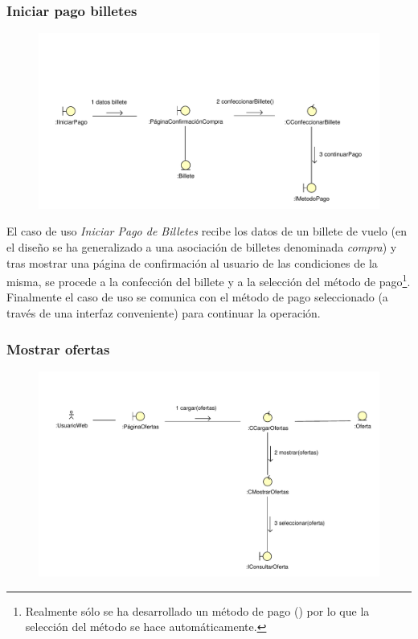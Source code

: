 \documentclass[11pt, a4paper, twoside, titlepage]{article}
\begin{document}
			\subsubsection{Iniciar pago billetes}
				\begin{figure}[H]\centering
					\includegraphics[scale=.76]{diagramas/iniciarpagobilletes.pdf}
				\end{figure}

					El caso de uso {\itshape Iniciar Pago de Billetes} recibe los datos de un billete de vuelo (en el diseño se ha generalizado a una asociación de billetes denominada {\itshape compra}) y tras mostrar una página de confirmación al usuario de las condiciones de la misma, se procede a la confección del billete y a la selección del método de pago\footnote{Realmente sólo se ha desarrollado un método de pago () por lo que la selección del método se hace automáticamente.}. Finalmente el caso de uso se comunica con el método de pago seleccionado (a través de una interfaz conveniente) para continuar la operación.

			\subsubsection{Mostrar ofertas}
				\begin{figure}[H]\centering
					\includegraphics[scale=.72]{diagramas/mostrarofertas.pdf}
				\end{figure}
\end{document}
